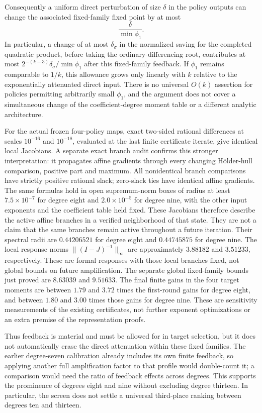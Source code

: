 \documentclass[11pt,letterpaper]{article}
\numberwithin{equation}{section}
\begin{document}
Consequently a uniform direct perturbation of size $\delta$ in the policy
outputs can change the associated fixed-family fixed point by at most
\[
 \frac{\delta}{\min\phi_1}.
\]
In particular, a change of at most $\delta_\sigma$ in the normalized saving for the
completed quadratic product, before taking the ordinary-differencing root, contributes at most
$2^{-(k-3)}\delta_\sigma/\min\phi_1$ after this fixed-family feedback.
If $\phi_1$ remains comparable to $1/k$, this allowance grows only linearly
with $k$ relative to the exponentially attenuated direct input. There is no
universal $O(k)$ assertion for policies permitting arbitrarily small
$\phi_1$, and the argument does not cover a simultaneous change of the
coefficient-degree moment table or a different analytic architecture.

For the actual frozen four-policy maps, exact two-sided rational differences
at scales $10^{-16}$ and $10^{-18}$, evaluated at the last finite certificate
iterate, give identical local Jacobians. A separate exact branch audit
confirms this stronger interpretation: it propagates affine gradients through
every changing H\"older-hull comparison, positive part and maximum. All
nonidentical branch comparisons have strictly positive rational slack;
zero-slack ties have identical affine gradients. The same formulas hold in
open supremum-norm boxes of radius at least $7.5\times10^{-7}$ for degree
eight and $2.0\times10^{-5}$ for degree nine, with the other input exponents
and the coefficient table held fixed. These Jacobians therefore describe
the active affine branches in a verified neighborhood of that state.
They are not a claim that the same branches
remain active throughout a future iteration. Their
spectral radii are $0.44206521$ for degree eight and $0.44745875$ for degree
nine. The local response norms $\|(I-J)^{-1}\|_\infty$ are approximately
$3.88182$ and $3.51233$, respectively. These are formal responses with those
local branches fixed, not global bounds on future amplification. The separate
global fixed-family bounds just proved are
$8.63039$ and $9.51633$. The final finite gains in the four target moments
are between $1.79$ and $3.72$ times the first-round gains for degree eight,
and between $1.80$ and $3.00$ times those gains for degree nine. These are
sensitivity measurements of the existing certificates, not further exponent
optimizations or an extra premise of the representation proofs.

Thus feedback is material and must be allowed for in target selection, but
it does not automatically erase the direct attenuation within these fixed
families. The earlier degree-seven calibration already includes its own
finite feedback, so applying another full amplification factor to that
profile would double-count it; a comparison would need the ratio of feedback
effects across degrees. This supports the prominence of degrees eight and
nine without excluding degree thirteen. In particular, the screen does not
settle a universal third-place ranking between degrees ten and thirteen.
\end{document}
